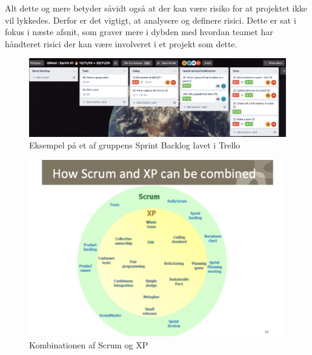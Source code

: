 Alt dette og mere %
betyder såvidt også at der kan være risiko for at projektet ikke vil lykkedes. Derfor er det vigtigt, at analysere og definere risici. Dette er sat i fokus i næste afsnit, som graver mere i dybden med hvordan teamet har håndteret risici der kan være involveret i et projekt som dette.


\begin{figure}
    \includegraphics[width=\linewidth]{figures/SprintBacklog.png}
    \caption{Eksempel på et af gruppens Sprint Backlog lavet i Trello}
    \label{fig:Sprint}
\end{figure}


\begin{figure}
    \includegraphics[width=\linewidth]{figures/XP&Scrum.png}
    \caption{Kombinationen af Scrum og XP}
    \label{fig:Kombi}
\end{figure}

